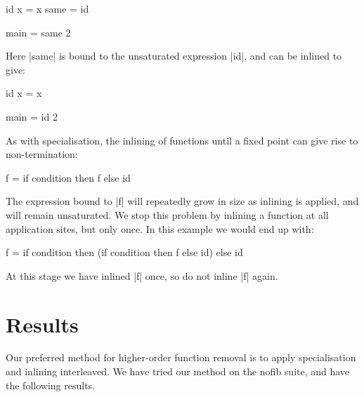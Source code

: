 \begin{example}
\begin{code}
id x = x
same = id

main = same 2
\end{code}

Here |same| is bound to the unsaturated expression |id|, and can be inlined to give:

\begin{code}
id x = x

main = id 2
\end{code}
\end{example}

As with specialisation, the inlining of functions until a fixed point can give rise to non-termination:

\begin{example}
\begin{code}
f = if condition then f else id
\end{code}

The expression bound to |f| will repeatedly grow in size as inlining is applied, and will remain unsaturated. We stop this problem by inlining a function at all application sites, but only once. In this example we would end up with:

\begin{code}
f = if condition then (if condition then f else id) else id
\end{code}

At this stage we have inlined |f| once, so do not inline |f| again.
\end{example}


\section{Results}

Our preferred method for higher-order function removal is to apply specialisation and inlining interleaved. We have tried our method on the nofib suite, and have the following results.


